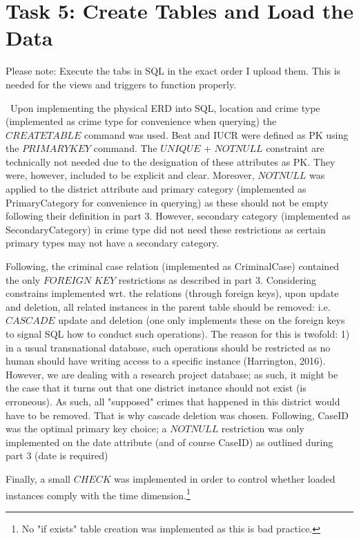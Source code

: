 \documentclass[a4paper]{article}
\begin{document}
\section{Task 5: Create Tables and Load the Data}

Please note: Execute the tabs in SQL in the exact order I upload them. This is needed for the views and triggers to function properly.

\
Upon implementing the physical ERD into SQL, location and crime type (implemented as crime type for convenience when querying) the $CREATE TABLE$ command was used. Beat and IUCR were defined as PK using the $PRIMARY KEY$ command. The $UNIQUE$ + $NOT NULL$ constraint are technically not needed due to the designation of these attributes as PK. They were, however, included to be explicit and clear. Moreover, $NOT NULL$ was applied to the district attribute and primary category (implemented as PrimaryCategory for convenience in querying) as these should not be empty following their definition in part 3. However, secondary category (implemented as SecondaryCategory) in crime type did not need these restrictions as certain primary types may not have a secondary category.

Following, the criminal case relation (implemented as CriminalCase) contained the only $FOREIGN$ $KEY$ restrictions as described in part 3. Considering constrains implemented wrt. the relations (through foreign keys), upon update and deletion, all related instances in the parent table should be removed: i.e. $CASCADE$ update and deletion (one only implements these on the foreign keys to signal SQL how to conduct such operations). The reason for this is twofold: 1) in a usual transnational database, such operations should be restricted as no human should have writing access to a specific instance (Harrington, 2016). However, we are dealing with a research project database; as such, it might be the case that it turns out that one district instance should not exist (is erroneous). As such, all "supposed" crimes that happened in this district would have to be removed. That is why cascade deletion was chosen. Following, CaseID was the optimal primary key choice; a $NOT NULL$ restriction was only implemented on the date attribute (and of course CaseID) as outlined during part 3 (date is required)

Finally, a small $CHECK$ was implemented in order to control whether loaded instances comply with the time dimension.\footnote{No "if exists" table creation was implemented as this is bad practice.}
\end{document}
